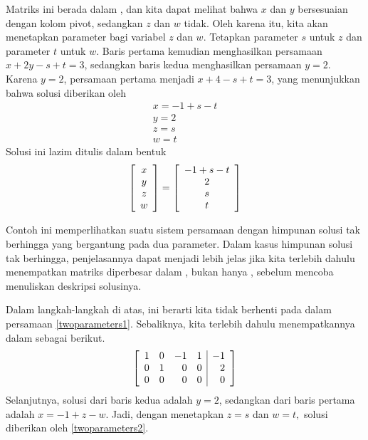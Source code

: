 \begin{solution}
Matriks ini berada dalam \ef, dan kita dapat melihat bahwa $x$ dan $y$
bersesuaian dengan kolom pivot, sedangkan $z$ dan $w$ tidak. Oleh karena itu, kita akan menetapkan parameter bagi variabel $z$ dan $w$.
Tetapkan parameter $s$ untuk $z$ dan parameter
$t$ untuk $w.$ Baris pertama kemudian menghasilkan persamaan $x+2y-s+t=3$, sedangkan baris kedua menghasilkan
persamaan $y=2$. Karena $y=2$, persamaan pertama menjadi $x+4-s+t=3$,
yang menunjukkan bahwa solusi diberikan oleh
\begin{equation*}
\begin{array}{c}
x=-1+s-t \\
y=2 \\
z=s \\
w=t
\end{array}
\end{equation*}
Solusi ini lazim ditulis dalam
bentuk
\begin{equation}
\left[
\begin{array}{c}
x \\
y \\
z \\
w
\end{array}
\right] =\left[
\begin{array}{c}
-1+s-t \\
2 \\
s \\
t
\end{array}
\right]   \label{twoparameters2}
\end{equation}

\end{solution}

Contoh ini memperlihatkan suatu sistem persamaan dengan himpunan solusi tak berhingga yang bergantung pada dua parameter.
Dalam kasus himpunan solusi tak berhingga, penjelasannya dapat menjadi lebih jelas jika kita terlebih dahulu
menempatkan matriks diperbesar dalam \rref, bukan hanya
\ef, sebelum mencoba menuliskan deskripsi solusinya.

Dalam langkah-langkah di atas, ini berarti kita tidak berhenti pada \ef \;dalam persamaan \ref{twoparameters1}.
Sebaliknya, kita terlebih dahulu menempatkannya dalam \rref \;sebagai berikut.
\begin{equation*}
\left[
\begin{array}{rrrr|r}
1 & 0 & -1 & 1 & -1 \\
0 & 1 & 0 & 0 & 2 \\
0 & 0 & 0 & 0 & 0
\end{array}
\right] 
\end{equation*}
Selanjutnya, solusi dari baris kedua adalah $y=2$, sedangkan dari baris
pertama adalah $x=-1+z-w$. Jadi, dengan menetapkan $z=s$ dan $w=t,$ solusi diberikan oleh \ref{twoparameters2}.

